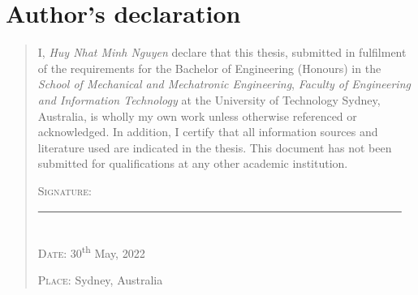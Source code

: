 \chapter*{Author's declaration}
\begin{quote}
I, 
\emph{Huy Nhat Minh Nguyen} declare that this thesis, submitted in fulfilment of the requirements for the Bachelor of Engineering (Honours) in the
\emph{School of Mechanical and Mechatronic Engineering}, 
\emph{Faculty of Engineering and Information Technology}
at the University of Technology Sydney, Australia, 
is wholly my own work unless otherwise referenced or acknowledged. 
In addition, I certify that all information sources and literature used are indicated in the thesis.
This document has not been submitted for qualifications at any other academic institution.

\vspace{1.5cm}
\noindent 
\hspace{-0.75cm}\textsc{Signature: } \underline{
~~~~~~~~~~~~~~~~~~~~~~~~~~~~~~~~~~~~~~~~~~~~~~~~~~~~~~~~~~~~~~~~
}


\noindent
\hspace{-0.75cm}{~~~~~~~~~~~~~~~~~~~~~~~~[Minh Nguyen]}\\

\noindent 
\hspace{-0.75cm}\textsc{Date: } 30\textsuperscript{th} May, 2022

\noindent 
\hspace{-0.75cm}\textsc{Place: } Sydney, Australia



\end{quote}
\clearpage